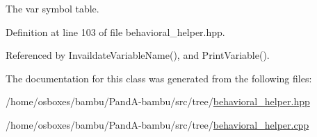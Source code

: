 The var symbol table. 



Definition at line 103 of file behavioral\+\_\+helper.\+hpp.



Referenced by Invaildate\+Variable\+Name(), and Print\+Variable().



The documentation for this class was generated from the following files\+:\begin{DoxyCompactItemize}
\item 
/home/osboxes/bambu/\+Pand\+A-\/bambu/src/tree/\hyperlink{behavioral__helper_8hpp}{behavioral\+\_\+helper.\+hpp}\item 
/home/osboxes/bambu/\+Pand\+A-\/bambu/src/tree/\hyperlink{behavioral__helper_8cpp}{behavioral\+\_\+helper.\+cpp}\end{DoxyCompactItemize}
